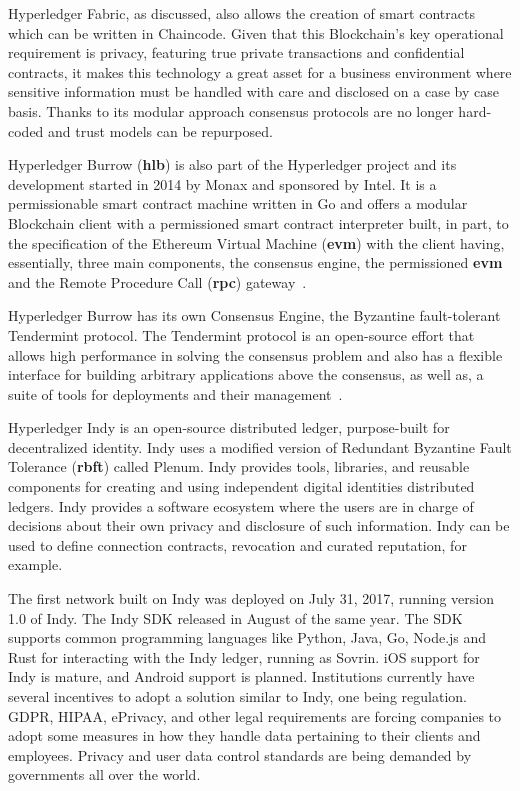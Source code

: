 Hyperledger Fabric, as discussed, also allows the creation of smart contracts
which can be written in Chaincode.  Given that this Blockchain's key
operational requirement is privacy, featuring true private transactions and
confidential contracts, it makes this technology a great asset for a business
environment where sensitive information must be handled with care and disclosed
on a case by case basis.  Thanks to its modular approach consensus protocols
are no longer hard-coded and trust models can be repurposed.

Hyperledger Burrow (\textbf{hlb}) is also part of the Hyperledger project and
its development started in 2014 by Monax and sponsored by Intel. It is a
permissionable smart contract machine written in Go and offers a modular
Blockchain client with a permissioned smart contract interpreter built, in
part, to the specification of the Ethereum Virtual Machine (\textbf{evm}) with
the client having, essentially, three main components, the consensus engine,
the permissioned \textbf{evm} and the Remote Procedure Call (\textbf{rpc})
gateway~\cite{Kuhlman2017,HyperledgerBurrow2017}.

Hyperledger Burrow has its own Consensus Engine, the Byzantine fault-tolerant
Tendermint protocol.  The Tendermint protocol is an open-source effort that
allows high performance in solving the consensus problem and also has a
flexible interface for building arbitrary applications above the consensus, as
well as, a suite of tools for deployments and their
management~\cite{Buchman2016}.

Hyperledger Indy is an open-source distributed ledger, purpose-built for
decentralized identity. Indy uses a modified version of Redundant Byzantine
Fault Tolerance (\textbf{rbft}) called Plenum. Indy provides tools, libraries,
and reusable components for creating and using independent digital identities
distributed ledgers. Indy provides a software ecosystem where the users are in
charge of decisions about their own privacy and disclosure of such information.
Indy can be used to define connection contracts, revocation and curated
reputation, for example.

The first network built on Indy was deployed on July 31, 2017, running version
1.0 of Indy. The Indy SDK released in August of the same year. The SDK supports
common programming languages like Python, Java, Go, Node.js and Rust for
interacting with the Indy ledger, running as Sovrin. iOS support for Indy is
mature, and Android support is planned. Institutions currently have several
incentives to adopt a solution similar to Indy, one being regulation. GDPR,
HIPAA, ePrivacy, and other legal requirements are forcing companies to adopt
some measures in how they handle data pertaining to their clients and
employees. Privacy and user data control standards are being demanded by
governments all over the world.
